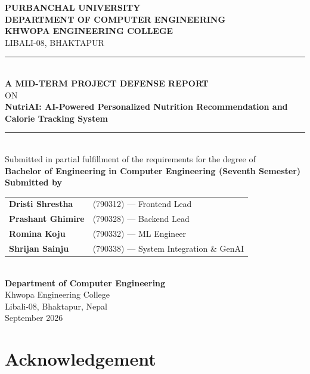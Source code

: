 \documentclass[12pt,a4paper]{report}
\begin{document}
\begin{titlepage}
\centering
\vspace*{0.3cm}
{\large\bfseries PURBANCHAL UNIVERSITY}\\[0.15cm]
{\normalsize\bfseries DEPARTMENT OF COMPUTER ENGINEERING}\\[0.1cm]
{\normalsize\bfseries KHWOPA ENGINEERING COLLEGE}\\[0.1cm]
{\normalsize LIBALI-08, BHAKTAPUR}\\[0.9cm]
\rule{\textwidth}{1.2pt}\\[0.3cm]
{\large\bfseries A MID-TERM PROJECT DEFENSE REPORT}\\[0.2cm]
{\normalsize ON}\\[0.45cm]
{\Large\bfseries NutriAI: AI-Powered Personalized Nutrition Recommendation and Calorie Tracking System}\\[0.3cm]
\rule{\textwidth}{1.2pt}\\[0.6cm]

{\normalsize Submitted in partial fulfillment of the requirements for the degree of}\\[0.3cm]
{\normalsize\bfseries Bachelor of Engineering in Computer Engineering (Seventh Semester)}\\[1.2cm]

{\large\bfseries Submitted by}\\[0.4cm]
{\normalsize
\begin{tabular}{ll}
\textbf{Dristi Shrestha}  & (790312) --- Frontend Lead \\[0.18cm]
\textbf{Prashant Ghimire} & (790328) --- Backend Lead \\[0.18cm]
\textbf{Romina Koju}      & (790332) --- ML Engineer \\[0.18cm]
\textbf{Shrijan Sainju}   & (790338) --- System Integration \& GenAI
\end{tabular}}\\[1.2cm]

{\normalsize\bfseries Department of Computer Engineering}\\
{\normalsize Khwopa Engineering College}\\
{\normalsize Libali-08, Bhaktapur, Nepal}\\[0.3cm]
{\normalsize September 2026}
\end{titlepage}

\chapter*{Acknowledgement}
\thispagestyle{plain}
\end{document}
